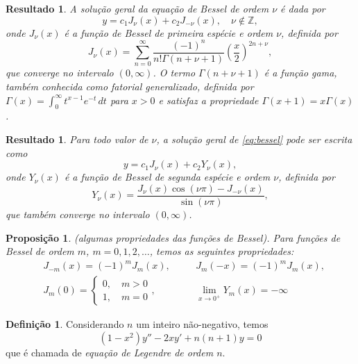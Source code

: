 \documentclass{article}
\theoremstyle{plain}
\newtheorem{prop}[thm]{Proposição}
\newtheorem{res}[thm]{Resultado}
\theoremstyle{definition}
\newtheorem{defn}{Definição}[section]
\theoremstyle{remark}
\begin{document}
\begin{res}
    A solução geral da equação de Bessel de ordem \(\nu\) é dada por
    \begin{equation}
        y = c_1 J_{\nu}(x) + c_2 J_{-\nu}(x), \quad \nu \notin \mathbb{Z},
    \end{equation}
    \noindent onde \(J_{\nu}(x)\) é a função de Bessel de primeira espécie e ordem \(\nu\), definida por
    \begin{equation}
        J_{\nu}(x) = \sum_{n=0}^{\infty} \frac{(-1)^n}{n! \Gamma(n+\nu+1)} \left(\frac{x}{2}\right)^{2n+\nu},
    \end{equation}
    \noindent que converge no intervalo \((0,\infty)\). O termo \(\Gamma(n+\nu+1)\) é a função gama, também conhecida como fatorial generalizado, definida por \(\Gamma(x) = \int_0^{\infty} t^{x-1} e^{-t} \, dt\) para \(x>0\) e satisfaz a propriedade \(\Gamma(x+1) = x\Gamma(x)\).
\end{res}

\begin{res}
    Para todo valor de \(\nu\), a solução geral de \eqref{eq:bessel} pode ser escrita como
    \begin{equation}
        y = c_1 J_{\nu}(x) + c_2 Y_{\nu}(x),
    \end{equation}
    \noindent onde \(Y_{\nu}(x)\) é a função de Bessel de segunda espécie e ordem \(\nu\), definida por
    \begin{equation}
        Y_{\nu}(x) = \frac{J_{\nu}(x) \cos(\nu \pi) - J_{-\nu}(x)}{\sin(\nu \pi)},
    \end{equation}
    \noindent que também converge no intervalo \((0,\infty)\).
\end{res}

\begin{prop} (algumas propriedades das funções de Bessel).
    Para funções de Bessel de ordem \(m\), \(m=0,1,2,\ldots\), temos as seguintes propriedades:
    \begin{align*}
        &J_{-m}(x) = (-1)^m J_m(x), \quad & &J_m(-x) = (-1)^m J_m(x), \\
        &J_m(0) = \begin{cases}
            0, \quad m > 0 \\
            1, \quad m = 0
        \end{cases}, \quad & &\lim_{x\to 0^{+}} Y_m(x) = -\infty
    \end{align*}
\end{prop}

\begin{defn}
    Considerando \(n\) um inteiro não-negativo, temos 
    \begin{equation}\label{eq:legendre}
        (1-x^2)y'' - 2xy' + n(n+1)y = 0
    \end{equation}
    \noindent que é chamada de \emph{equação de Legendre de ordem \(n\)}.
\end{defn}
\end{document}
